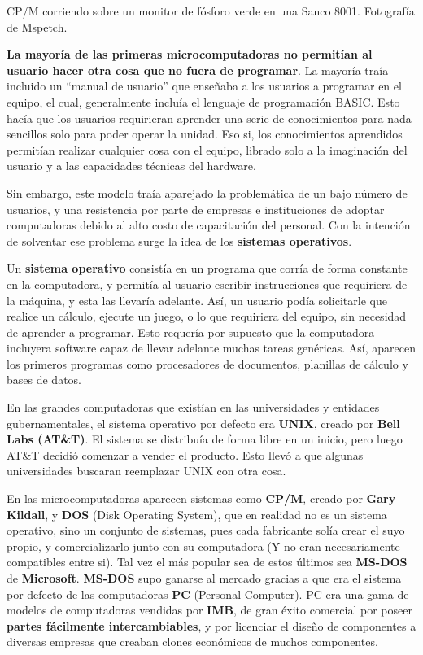 {CP/M corriendo sobre un monitor de fósforo verde en una Sanco 8001.}
{Fotografía de Mspetch.}

\textbf{La mayoría de las primeras microcomputadoras no permitían al usuario
hacer otra cosa que no fuera de programar}. La mayoría traía incluido un
``manual de usuario'' que enseñaba a los usuarios a programar en el equipo, el
cual, generalmente incluía el lenguaje de programación BASIC. Esto hacía que los
usuarios requirieran aprender una serie de conocimientos para nada sencillos
solo para poder operar la unidad. Eso si, los conocimientos aprendidos permitían
realizar cualquier cosa con el equipo, librado solo a la imaginación del usuario
y a las capacidades técnicas del hardware.

Sin embargo, este modelo traía aparejado la problemática de un bajo número de
usuarios, y una resistencia por parte de empresas e instituciones de adoptar
computadoras debido al alto costo de capacitación del personal. Con la intención
de solventar ese problema surge la idea de los \textbf{sistemas operativos}.

Un \textbf{sistema operativo} consistía en un programa que corría de forma
constante en la computadora, y permitía al usuario escribir instrucciones que
requiriera de la máquina, y esta las llevaría adelante. Así, un usuario podía
solicitarle que realice un cálculo, ejecute un juego, o lo que requiriera del
equipo, sin necesidad de aprender a programar. Esto requería por supuesto que la
computadora incluyera software capaz de llevar adelante muchas tareas genéricas.
Así, aparecen los primeros programas como procesadores de documentos, planillas
de cálculo y bases de datos.\autocite[cap. 3]{ceruzzi_2003}

En las grandes computadoras que existían en las universidades y entidades
gubernamentales, el sistema operativo por defecto era \textbf{UNIX}, creado por
\textbf{Bell Labs (AT\&T)}. El sistema se distribuía de forma libre en un
inicio, pero luego AT\&T decidió comenzar a vender el producto. Esto llevó a que
algunas universidades buscaran reemplazar UNIX con otra cosa.

 En las
microcomputadoras aparecen sistemas como \textbf{CP/M}, creado por \textbf{Gary
Kildall}, y \textbf{DOS} (Disk Operating System), que en realidad no es un
sistema operativo, sino un conjunto de sistemas, pues cada fabricante solía
crear el suyo propio, y comercializarlo junto con su computadora (Y no eran
necesariamente compatibles entre si). Tal vez el más popular sea de estos
últimos sea \textbf{MS-DOS} de \textbf{Microsoft}. \textbf{MS-DOS} supo ganarse
al mercado gracias a que era el sistema por defecto de las computadoras
\textbf{PC} (Personal Computer). PC era una gama de modelos de computadoras
vendidas por \textbf{IMB}, de gran éxito comercial por poseer \textbf{partes
fácilmente intercambiables}, y por licenciar el diseño de componentes a diversas
empresas que creaban clones económicos de muchos componentes.

